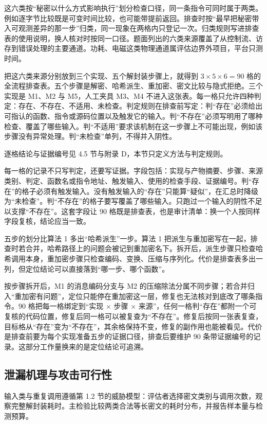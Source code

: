 这六类按“秘密以什么方式影响执行”划分检查口径，同一条指令可同时属于两类。例如逐字节比较既是可变时间比较，也可能带提前返回。排查时按“最早把秘密带入可观测差异的那一步”归类，同一现象在两格内只登记一次。归类规则写进排查表的使用说明，换人核对时按同一口径。题面列出的六类来源覆盖了从控制流、访存到错误处理的主要通道。功耗、电磁这类物理通道属评估边界外项目，平台只测时间。

把这六类来源分别放到三个实现、五个解封装步骤上，就得到 $3\times5\times6=90$ 格的全流程排查表。五个步骤是解密、哈希派生、重加密、密文比较与隐式拒绝。三个实现是 M1、M2 与 M5，人工夹具 M3、M4 不进入这张表。每一格只允许四种判定：存在、不存在、不适用、未检查。判定规则在排查前写定：判“存在”必须给出可指认的函数、指令或源码位置以及触发它的输入。判“不存在”必须写明用了哪种检查、覆盖了哪些输入。判“不适用”要求该机制在这一步骤上不可能出现，例如该步骤没有异常处理。判“未检查”单列，不得并入阴性。

逐格结论与证据编号见 4.5 节与附录 D，本节只定义方法与判定规则。

每一格的记录不只写判定，还要写证据。字段包括：实现与产物摘要、步骤、来源类别、判定、函数名或指令地址、触发输入、使用的检查手段、证据编号。判“存在”的格子必须有触发输入。没有触发输入的“存在”只能算“疑似”，在汇总时降级为“未检查”。判“不存在”的格子要写覆盖了哪些输入。只跑过一个输入的阴性不足以支撑“不存在”。这套字段让 90 格既是排查表，也是审计清单：换一个人按同样字段复核，结论应当一致。

五步的划分比算法 1 多出“哈希派生”一步。算法 1 把派生与重加密写在一起，排查时若合并，哈希路径上的问题会被记到重加密名下。拆开后，派生步骤只检查哈希调用本身，重加密步骤只检查编码、变换、压缩与序列化。代价是排查表多出一列，但定位结论可以直接落到“哪一步、哪个函数”。

按步骤拆开后，M1 的消息编码分支与 M2 的压缩除法分属不同步骤；若合并归入“重加密有问题”，定位只能停在重加密这一层，修复也无法核对到底改了哪条指令。90 格把每一格绑定到“实现 × 步骤 × 来源”，任何一格判“存在”都附一个可复核的代码位置，修复后同一格可以被复查为“不存在”。修复后按同一张表复查，目标格从“存在”变为“不存在”，其余格保持不变，修复的副作用也能被看见。代价是排查前要为每个实现准备五步的证据口径，排查后要维护 90 条带证据编号的记录。这部分工作量换来的是定位结论可追溯。

\subsection{泄漏机理与攻击可行性}

输入类与重复调用遵循第 1.2 节的威胁模型：评估者选择密文类别与调用次数，观察完整解封装耗时。主检验比较两类合法等长密文的耗时分布，并报告样本量与检测预算。

